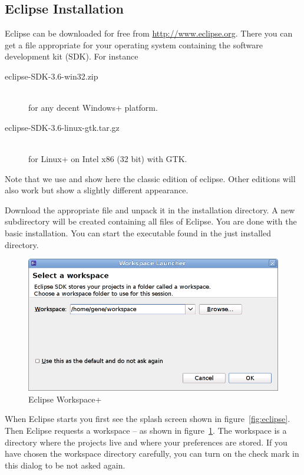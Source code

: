 \subsection{Eclipse Installation}

Eclipse can be downloaded for free from \url{http://www.eclipse.org}.
There you can get a file appropriate for your operating system
containing the software development kit (SDK). For instance
\begin{description}
\item [eclipse-SDK-3.6-win32.zip]\ \\
  for any decent \+Windows+ platform.
\item [eclipse-SDK-3.6-linux-gtk.tar.gz]\ \\
  for \+Linux+ on Intel x86 (32 bit) with GTK.
\end{description}

Note that we use and show here the classic
edition of eclipse. Other editions will
also work but show a slightly different appearance.

Download the appropriate file and unpack it in the installation
directory. A new subdirectory  will be created
containing all files of Eclipse. You are done with the basic
installation. You can start the  executable found in
the just installed directory.

\begin{figure}[ht]
  \centering  \includegraphics[scale=.5]{image/eclipse/workspace}
  \caption{\+Eclipse Workspace+}\label{fig:eclipse-workspace}
\end{figure}
When Eclipse starts you first see the splash
screen shown in figure~\ref{fig:eclipse}.
Then Eclipse requests a workspace -- as shown in
figure~\ref{fig:eclipse-workspace}. The
workspace is a directory where the projects
live and where your preferences are stored. If you have chosen the
workspace directory carefully, you can turn on the check mark in this
dialog to be not asked again.

